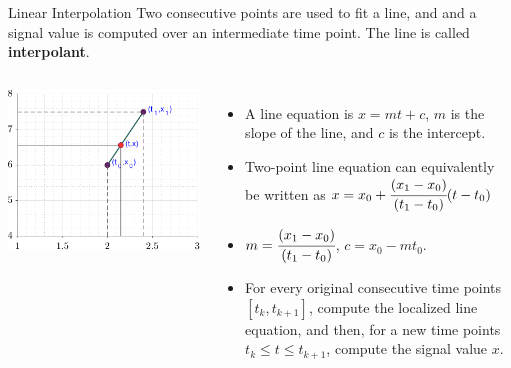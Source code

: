 \documentclass[aspectratio=169,xcolor=dvipsnames,svgnames,x11names,fleqn]{beamer}
\begin{document}
\begin{frame}
    \subsectionpage
\end{frame}

\begin{frame}{Linear Interpolation}
Two consecutive points are used to fit a line, and and a signal value is computed over an intermediate time point. The line is called \textbf{interpolant}.

\begin{columns}
\begin{center}
\includegraphics[width=0.75\linewidth]{../Code/figures/Ch02_line_equation.pdf}

\end{center}



\footnotesize
\begin{itemize}
\item A line equation is $x = mt + c$, $m$ is the slope of the line, and $c$ is the intercept.

\item Two-point line equation can equivalently be written as $ x = x_0+ \cfrac{(x_1 - x_0)}{(t_1 - t_0)} (t - t_0)$  

\item $m = \cfrac{(x_1 - x_0)}{(t_1 - t_0)}$, $c = x_0 - m t_0$.

\item For every original consecutive time points $[t_k, t_{k+1}]$, compute the localized line equation, and then, for a new time points   $t_{k}\leq t\leq t_{k+1}$, compute the signal value $x$.
\end{itemize}
\end{columns}
\end{frame}
\end{document}

